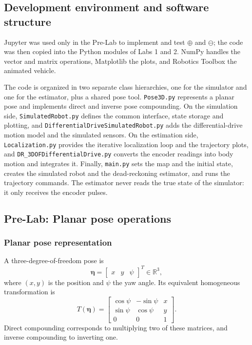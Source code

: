 \documentclass[letterpaper,12pt]{article}
\newcommand{\R}{\mathbb{R}}
\begin{document}
\subsection{Development environment and software structure}

Jupyter was used only in the Pre-Lab to implement and test $\oplus$ and
$\ominus$; the code was then copied into the Python modules of Labs 1 and 2.
NumPy handles the vector and matrix operations, Matplotlib the plots, and
Robotics Toolbox the animated vehicle.

The code is organized in two separate class hierarchies, one for the
simulator and one for the estimator, plus a shared pose tool.
\texttt{Pose3D.py} represents a planar pose and implements direct and inverse
pose compounding. On the simulation side, \texttt{SimulatedRobot.py} defines
the common interface, state storage and plotting, and
\texttt{DifferentialDriveSimulatedRobot.py} adds the differential-drive motion
model and the simulated sensors. On the estimation side,
\texttt{Localization.py} provides the iterative localization loop and the
trajectory plots, and \texttt{DR\_3DOFDifferentialDrive.py} converts the
encoder readings into body motion and integrates it. Finally, \texttt{main.py}
sets the map and the initial state, creates the simulated robot and the
dead-reckoning estimator, and runs the trajectory commands. The estimator
never reads the true state of the simulator: it only receives the encoder
pulses.

\subsection{Pre-Lab: Planar pose operations}
\label{sec:prelab}

\subsubsection{Planar pose representation}

A three-degree-of-freedom pose is
\begin{equation}
    \boldsymbol{\eta}=
    \begin{bmatrix}x&y&\psi\end{bmatrix}^{T}\in\R^{3},
\end{equation}
where $(x,y)$ is the position and $\psi$ the yaw angle. Its equivalent
homogeneous transformation is
\begin{equation}
    T(\boldsymbol{\eta})=
    \begin{bmatrix}
        \cos\psi & -\sin\psi & x\\
        \sin\psi &  \cos\psi & y\\
        0 & 0 & 1
    \end{bmatrix}.
    \label{eq:pose-transform}
\end{equation}
Direct compounding corresponds to multiplying two of these matrices, and
inverse compounding to inverting one.
\end{document}

